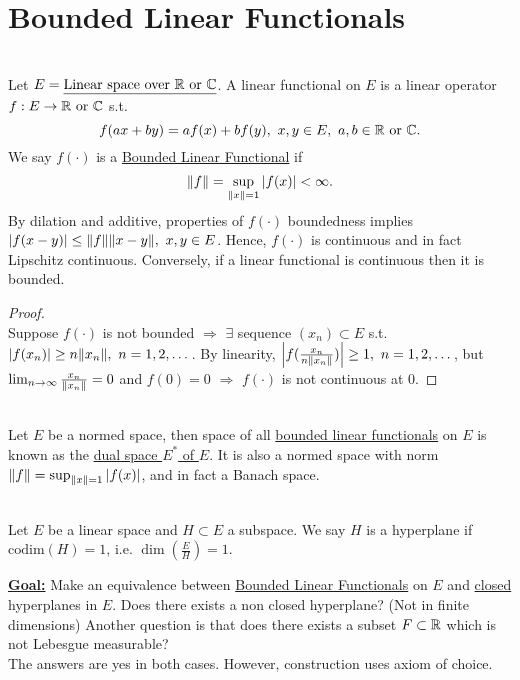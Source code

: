 \section{Bounded Linear Functionals}
\begin{definition}\ \\
Let $E = \underline{\text{Linear space over } \mathbb{R} \text{ or } \mathbb{C}}$. A linear functional on $E$ is a linear operator $f: E \to \mathbb{R} \text{ or } \mathbb{C}$ s.t. 
$$f(ax + by) = af(x) + bf(y),\ x,y \in E,\ a,b \in \mathbb{R}\text{ or }\mathbb{C}.$$ 
We say $f(\cdot)$ is a \underline{Bounded Linear Functional} if 
$$\norm{f} = \sup_{\norm{x} = 1} \abs{f(x)} < \infty.$$ 
By dilation and additive, properties of $f(\cdot)$ boundedness implies $\abs{f(x - y)} \leq \norm{f} \norm{x - y},\ x,y \in E$. Hence, $f(\cdot)$ is continuous and in fact Lipschitz continuous. Conversely, if a linear functional is continuous then it is bounded. 
\end{definition}
\begin{proof}\ \\
Suppose $f(\cdot)$ is not bounded $\Rightarrow$ $\exists$ sequence $(x_n) \subset E$ s.t. $\abs{f(x_n)} \geq n \norm{x_n},\ n=1,2,\dots$. By linearity, $\abs{f(\frac{x_n}{n \norm{x_n}})} \geq 1,\ n=1,2,\dots$, but $\lim_{n \to \infty} \frac{x_n}{\norm{x_n}} = 0$ and $f(0) = 0$ $\Rightarrow$ $f(\cdot)$ is not continuous at $0$.
\end{proof}

\begin{definition}\ \\
    Let $E$ be a normed space, then space of all \underline{bounded linear functionals} on $E$ is known as the \underline{dual space $E^*$ of $E$}. It is also a normed space with norm $\norm{f} = \sup_{\norm{x} = 1} \abs{f(x)}$, and in fact a Banach space.
\end{definition}

\begin{definition}\ \\
    Let $E$ be a linear space and $H \subset E$ a subspace. We say $H$ is a hyperplane if $\text{codim}(H) = 1$, i.e. $\dim(\frac{E}{H}) = 1$. 
\end{definition}

\np \textbf{\underline{Goal:}} Make an equivalence between \underline{Bounded Linear Functionals} on $E$ and \underline{closed} hyperplanes in $E$. Does there exists a non closed hyperplane? (Not in finite dimensions) Another question is that does there exists a subset $F \subset \mathbb{R}$ which is not Lebesgue
measurable?\\ 
The answers are yes in both cases. However, construction uses axiom of choice.

